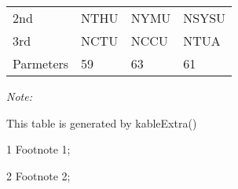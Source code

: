 \begin{table}
\begin{threeparttable}
\begin{tabular}[t]{llll}
\hspace{1em}2nd & NTHU & NYMU & NSYSU\\
\hspace{1em}3rd & NCTU & NCCU & NTUA\\
Parmeters & 59 & 63 & 61\\
\bottomrule
\end{tabular}
\begin{tablenotes}
\item \textit{Note: } 
\item This table is generated by kableExtra()
\item[1] Footnote 1; 
\item[2] Footnote 2; 
\end{tablenotes}
\end{threeparttable}
\end{table}
